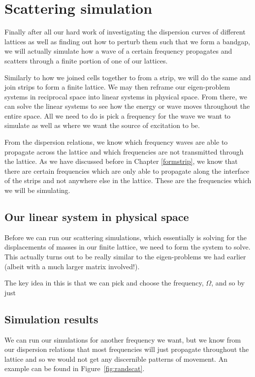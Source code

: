 \chapter{Scattering simulation}
\label{scattering}
Finally after all our hard work of investigating the dispersion curves of
different lattices as well as finding out how to perturb them such that we form
a bandgap, we will actually simulate how a wave of a certain frequency
propagates and scatters through a finite portion of one of our lattices.

Similarly to how we joined cells together to from a strip, we will do the same
and join strips to form a finite lattice. We may then reframe our eigen-problem
systems in reciprocal space into linear systems in physical space. From there,
we can solve the linear systems to see how the energy or wave moves throughout
the entire space. All we need to do is pick a frequency for the wave we want to
simulate as well as where we want the source of excitation to be.

From the dispersion relations, we know which frequency waves are able to
propagate across the lattice and which frequencies are not transmitted through
the lattice. As we have discussed before in Chapter \ref{formstrip}, we know
that there are certain frequencies which are only able to propagate along the
interface of the strips and not anywhere else in the lattice. These are the
frequencies which we will be simulating.

\section{Our linear system in physical space}
Before we can run our scattering simulations, which essentially is solving for
the displacements of masses in our finite lattice, we need to form the system
to solve. This actually turns out to be really similar to the eigen-problems we
had earlier (albeit with a much larger matrix involved!).

The key idea in this is that we can pick and choose the frequency, $\Omega$,
and so by just

\section{Simulation results}
We can run our simulations for another frequency we want, but we know from our
dispersion relations that most frequencies will just propagate throughout the
lattice and so we would not get any discernible patterns of movement. An
example can be found in Figure~\ref{fig:randscat}.

